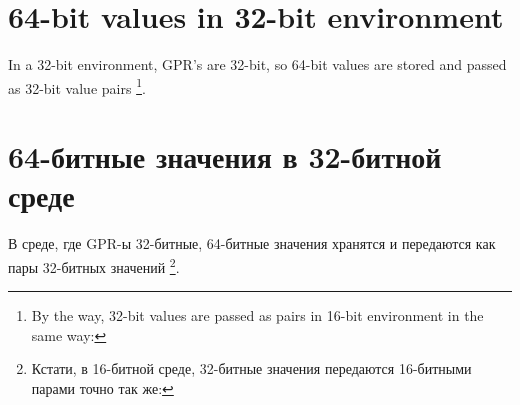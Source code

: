 \ifdefined\ENGLISH
\section{64-bit values in 32-bit environment}
\label{sec:64bit_in_32_env}

In a 32-bit environment, \ac{GPR}'s are 32-bit, so 64-bit values are stored and passed as 32-bit value pairs
\footnote{By the way, 32-bit values are passed as pairs in 16-bit environment in the same way: }.
\fi

\ifdefined\RUSSIAN
\section{64-битные значения в 32-битной среде}
\label{sec:64bit_in_32_env}

В среде, где \ac{GPR}-ы 32-битные, 64-битные значения хранятся и передаются как пары 32-битных значений
\footnote{Кстати, в 16-битной среде, 32-битные значения передаются 16-битными парами точно так же: }.
\fi







